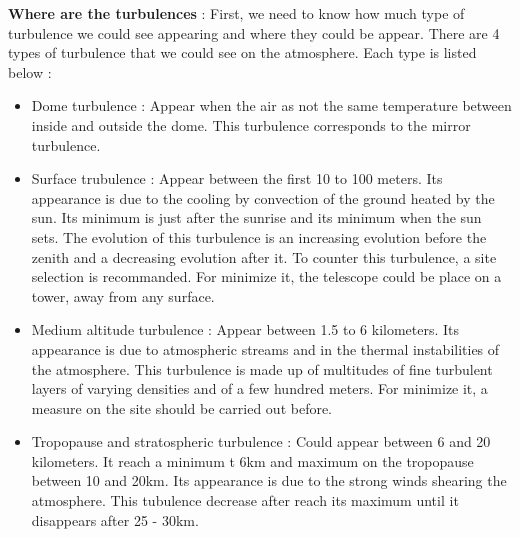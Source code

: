 \bigbreak
\textbf{Where are the turbulences} : \newline
First, we need to know how much type of turbulence we could see appearing and where they could be appear.\newline
There are 4 types of turbulence that we could see on the atmosphere. Each type is listed below :
\begin{itemize}
    \item Dome turbulence : \newline Appear when the air as not the same temperature between inside and outside the dome. This turbulence corresponds to 
    the mirror turbulence.
    \item Surface trubulence : \newline Appear between the first 10 to 100 meters. Its appearance is due to the cooling by convection of the ground 
    heated by the sun. Its minimum is just after the sunrise and its minimum when the sun sets. The evolution of this turbulence is an increasing 
    evolution before the zenith and a decreasing evolution after it.\newline
    To counter this turbulence, a site selection is recommanded. For minimize it, the telescope could be place on a tower, away from any surface.
    \item Medium altitude turbulence : \newline Appear between 1.5 to 6 kilometers. Its appearance is due to atmospheric streams and in the thermal 
    instabilities of the atmosphere. This turbulence is made up of multitudes of fine turbulent layers of varying densities and of a few hundred 
    meters. For minimize it, a measure on the site should be carried out before.
    \item Tropopause and stratospheric turbulence : \newline Could appear between 6 and 20 kilometers. It reach a minimum t 6km and maximum on the 
    tropopause between 10 and 20km. Its appearance is due to the strong winds shearing the atmosphere. This tubulence decrease after reach its maximum 
    until it disappears after 25 - 30km.
\end{itemize}

